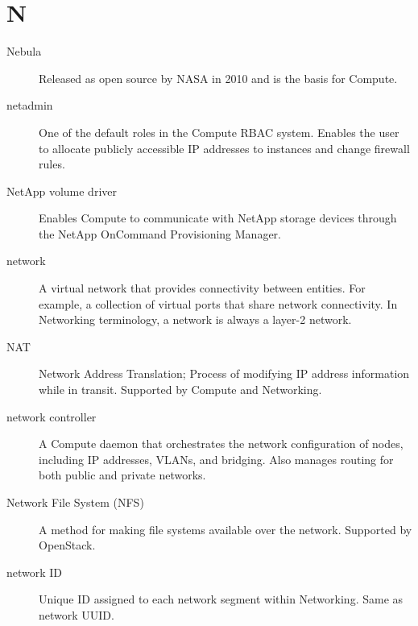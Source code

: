 \documentclass[letterpaper,10pt,english]{sphinxmanual}
\begin{document}
\section{N}
\label{_source/glossary:n}\begin{description}
\item[{Nebula}] \leavevmode{}\label{_source/glossary:term-nebula}
Released as open source by NASA in 2010 and is the basis for
Compute.

\item[{netadmin}] \leavevmode{}\label{_source/glossary:term-netadmin}
One of the default roles in the Compute RBAC system. Enables the
user to allocate publicly accessible IP addresses to instances and
change firewall rules.

\item[{NetApp volume driver}] \leavevmode{}\label{_source/glossary:term-netapp-volume-driver}
Enables Compute to communicate with NetApp storage devices
through the NetApp OnCommand
Provisioning Manager.

\item[{network}] \leavevmode{}\label{_source/glossary:term-network}
A virtual network that provides connectivity between entities.
For example, a collection of virtual ports that share network
connectivity. In Networking terminology, a network is always a layer-2
network.

\item[{NAT}] \leavevmode{}\label{_source/glossary:term-nat}
Network Address Translation; Process of modifying IP address
information while in transit. Supported by Compute and
Networking.

\item[{network controller}] \leavevmode{}\label{_source/glossary:term-network-controller}
A Compute daemon that orchestrates the network configuration of
nodes, including IP addresses, VLANs, and bridging. Also manages
routing for both public and private networks.

\item[{Network File System (NFS)}] \leavevmode{}\label{_source/glossary:term-network-file-system-nfs}
A method for making file systems available over the network.
Supported by OpenStack.

\item[{network ID}] \leavevmode{}\label{_source/glossary:term-network-id}
Unique ID assigned to each network segment within Networking.
Same as network UUID.


\end{description}
\end{document}

